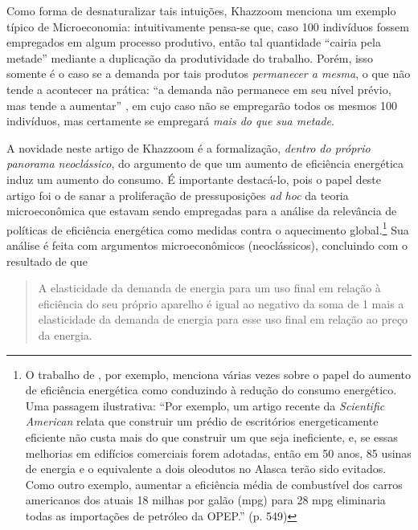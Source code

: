 Como forma de desnaturalizar tais intuições, Khazzoom menciona um exemplo típico de Microeconomia: intuitivamente pensa-se que, caso 100 indivíduos fossem empregados em algum processo produtivo, então tal quantidade ``cairia pela metade'' mediante a duplicação da produtividade do trabalho. Porém, isso somente é o caso se a demanda por tais produtos \textit{permanecer a mesma}, o que não tende a acontecer na prática: ``a demanda não permanece em seu nível prévio, mas tende a aumentar'' \parencite[p. 23]{Khazzoom1980}, em cujo caso não se empregarão todos os mesmos 100 indivíduos, mas certamente se empregará \textit{mais do que sua metade}.

A novidade neste artigo de Khazzoom é a formalização, \textit{dentro do próprio panorama neoclássico}, do argumento de que um aumento de eficiência energética induz um aumento do consumo. É importante destacá-lo, pois o papel deste artigo foi o de sanar a proliferação de pressuposições \textit{ad hoc} da teoria microeconômica que estavam sendo empregadas para a análise da relevância de políticas de eficiência energética como medidas contra o aquecimento global.\footnote{O trabalho de \textcite{Keepin1988}, por exemplo, menciona várias vezes sobre o papel do aumento de eficiência energética como conduzindo à redução do consumo energético. Uma passagem ilustrativa: ``Por exemplo, um artigo recente da \textit{Scientific American} relata que construir um prédio de escritórios energeticamente eficiente não custa mais do que construir um que seja ineficiente, e, se essas melhorias em edifícios comerciais forem adotadas, então em 50 anos, 85 usinas de energia e o equivalente a dois oleodutos no Alasca terão sido evitados. Como outro exemplo, aumentar a eficiência média de combustível dos carros americanos dos atuais 18 milhas por galão (mpg) para 28 mpg eliminaria todas as importações de petróleo da OPEP.'' (p. 549)} Sua análise é feita com argumentos microeconômicos (neoclássicos), concluindo com o resultado de que 
\begin{quote}
    A elasticidade da demanda de energia para um uso final em relação à eficiência do seu próprio aparelho é igual ao negativo da soma de 1 mais a elasticidade da demanda de energia para esse uso final em relação ao preço da energia. \parencite[p. 31]{Khazzoom1980}
\end{quote}

